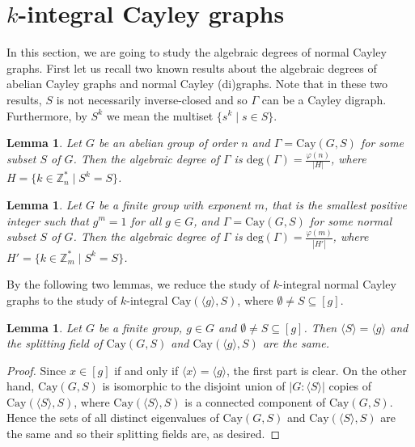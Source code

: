 \documentclass[12pt,a4paper]{article}
\newtheorem{lem}[thm]{Lemma}
\begin{document}
	\section{$k$-integral Cayley graphs}
	In this section, we are going to study the algebraic degrees of normal Cayley graphs. 
	First let us recall two known results about the algebraic degrees of abelian Cayley graphs and  normal Cayley (di)graphs. Note that in these two results, $S$ is not necessarily inverse-closed and so $\Gamma$ can be a Cayley digraph. Furthermore, by $S^k$ we mean the multiset $\{s^k\mid s\in S\}$. 
	
	\begin{lem}\cite[Theorem 1]{LM}\label{lem:abelian-deg}
		Let $G$ be an abelian group of order $n$ and $\Gamma=\mathrm{Cay}(G,S)$ for some subset $S$ of $G$. Then the algebraic degree of $\Gamma$ is $\mathrm{deg}(\Gamma)=\frac{\varphi(n)}{|H|}$,
		where $H=\{k\in \mathbb{Z}_n^*\mid S^k=S\}$.	
	\end{lem}
	\begin{lem}\cite[Corollary 3.10]{SMT-2}\label{lem:normal-deg}
		Let $G$ be a finite group with exponent $m$, that is the smallest positive integer such that $g^{m}=1$ for all $g\in G$, and $\Gamma=\mathrm{Cay}(G,S)$ for some normal subset $S$ of $G$. Then the algebraic degree of $\Gamma$ is
		$\mathrm{deg}(\Gamma)=\frac{\varphi(m)}{|H'|}$,
		where $H'=\{k\in \mathbb{Z}_m^*\mid S^k=S\}$.
	\end{lem}
	
	

	
	
	By the following two lemmas, we reduce the study of $k$-integral normal Cayley graphs to the study of $k$-integral $\mathrm{Cay}(\langle g\rangle,S)$, where $\emptyset\neq S\subseteq [g]$.
	\begin{lem}\label{comp}
		Let $G$ be a finite group, $g\in G$ and $\emptyset\neq S\subseteq [g]$. Then $\langle S\rangle=\langle g\rangle$ and the splitting field of $\mathrm{Cay}(G,S)$ and $\mathrm{Cay}(\langle g\rangle,S)$ are the same.
	\end{lem}
	\begin{proof}
		Since $x\in [g]$ if and only if $\langle x\rangle=\langle g\rangle$, the first part is clear. On the other hand, $\mathrm{Cay}(G,S)$ is isomorphic to the disjoint union of $|G:\langle S\rangle|$ copies of
		$\mathrm{Cay}(\langle S\rangle,S)$, where $\mathrm{Cay}(\langle S\rangle,S)$ is a connected component of $\mathrm{Cay}(G,S)$. Hence the sets of all distinct eigenvalues of $\mathrm{Cay}(G,S)$ and $\mathrm{Cay}(\langle S\rangle,S)$ are the same and so their splitting fields are, as desired.
	\end{proof}
	
\end{document}
